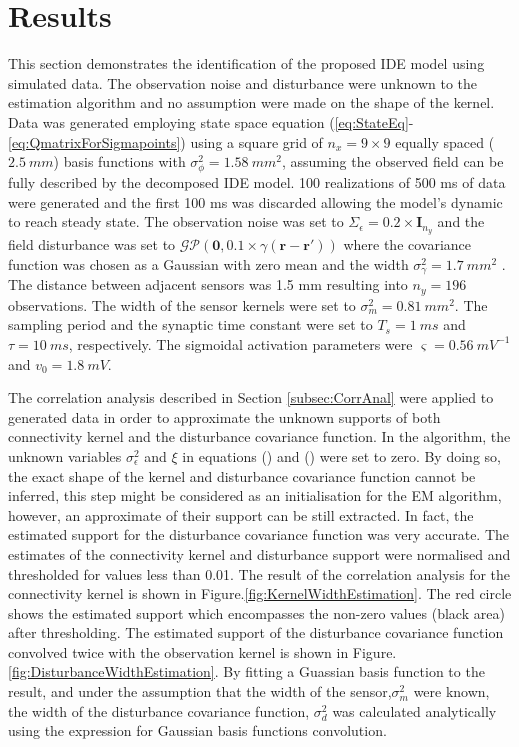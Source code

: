 \documentclass[]{article}
\begin{document}
\section{Results}
This section demonstrates the identification of the proposed IDE model using simulated data. The observation noise and disturbance were unknown to the estimation algorithm and no assumption were made on the shape of the kernel.  Data was generated employing state space equation (\ref{eq:StateEq}-\ref{eq:QmatrixForSigmapoints}) using a square grid of $n_x= 9 \times 9$ equally spaced ($2.5~mm$) basis functions with $\sigma_{\phi}^2=1.58~mm^2$, assuming the observed field can be fully described by the decomposed IDE model. 100 realizations of 500 ms of data were generated and the first 100 ms was discarded allowing the model's dynamic to reach steady state. The observation noise was set to $\Sigma_{\epsilon}=0.2\times \mathbf I_{n_y}$ and the field disturbance was set to $\mathcal{GP}(\mathbf 0,0.1 \times\gamma(\mathbf{r}-\mathbf{r}'))$ where the covariance function was chosen as a Gaussian with zero mean and the width $\sigma_{\gamma}^2=1.7~mm^2$ . The distance between adjacent sensors was 1.5 mm resulting into $n_y = 196$ observations. The width of the sensor kernels were set to $\sigma_m^2=0.81~mm^2$. The sampling period and the synaptic time constant were set to $T_s = 1~ms$  and $\tau = 10~ms$, respectively. The sigmoidal activation parameters were $\varsigma=0.56~mV^{-1}$ and $v_0=1.8~mV$.

The correlation analysis described in Section \ref{subsec:CorrAnal} were applied to generated data in order to approximate the unknown supports of both connectivity kernel and the disturbance covariance function. In the algorithm, the unknown variables $\sigma_{\epsilon}^2$ and $\xi$ in equations () and () were set to zero. By doing so, the exact shape of the kernel and disturbance covariance function cannot be inferred, this step might be considered as an initialisation for the EM algorithm, however, an approximate of their support can be still extracted. In fact, the estimated support for the disturbance covariance function was very accurate. The estimates of the connectivity kernel and disturbance support were normalised and thresholded for values less than 0.01. The result of the correlation analysis for the connectivity kernel is shown in Figure.\ref{fig:KernelWidthEstimation}. The red circle shows the estimated support which encompasses the non-zero values (black area) after thresholding. The estimated support of the disturbance covariance function convolved twice with the observation kernel is shown in Figure.\ref{fig:DisturbanceWidthEstimation}. By fitting a Guassian basis function to the result, and under the assumption that the width of the sensor,$\sigma_m^2$ were known, the width of the disturbance covariance function, $\sigma_d^2$ was calculated analytically using the expression for Gaussian basis functions convolution.
\end{document}
